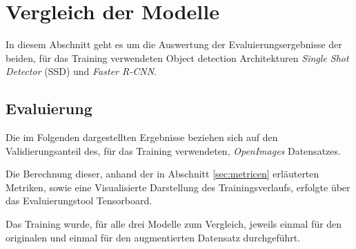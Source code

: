\section{Vergleich der Modelle}\label{sec:model_vergleich}

In diesem Abschnitt geht es um die Auswertung 
der Evaluierungsergebnisse der beiden, für das Training 
verwendeten Object detection Architekturen \textit{Single
Shot Detector} (SSD) und \textit{Faster R-CNN}.


\subsection{Evaluierung}

Die im Folgenden dargestellten Ergebnisse beziehen sich auf 
den Validierungsanteil des, für das Training verwendeten, 
\textit{OpenImages} Datensatzes.

Die Berechnung dieser, anhand der in Abschnitt
 \ref{sec:metricen} erläuterten Metriken, sowie 
eine Visualisierte Darstellung 
des Trainingsverlaufs, erfolgte
über das Evaluierungstool Tensorboard.

Das Training wurde, für alle drei Modelle
zum Vergleich, jeweils einmal für den originalen
und einmal für den augmentierten Datensatz durchgeführt.

